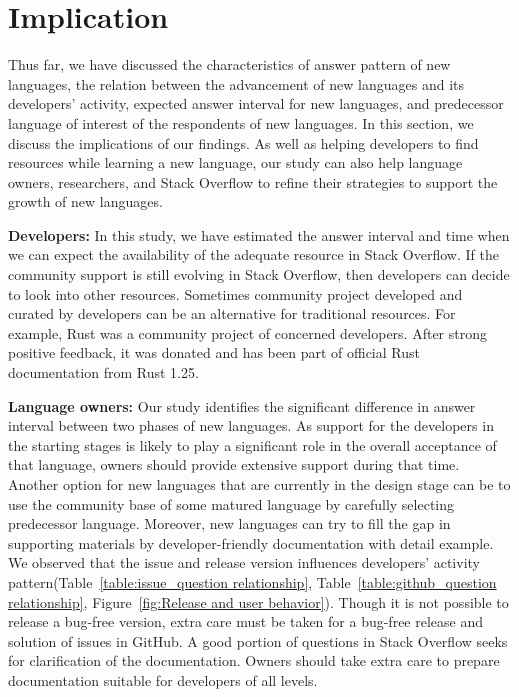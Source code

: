 \section{Implication}
\label{sec:Implication}
Thus far, we have discussed the characteristics of answer pattern of new languages, the relation between the advancement of new languages and its developers' activity, expected answer interval for new languages, and predecessor language of interest of the respondents of new languages. In this section, we discuss the implications of our findings. As well as helping developers to find resources while learning a new language, our study can also help language owners, researchers, and Stack Overflow to refine their strategies to support the growth of new languages. 

\indent \textbf{Developers:} In this study, we have estimated the answer interval and time when we can expect the availability of the adequate resource in Stack Overflow. If the community support is still evolving in Stack Overflow, then developers can decide to look into other resources. Sometimes community project developed and curated by developers can be an alternative for traditional resources. For example, Rust was a community project of concerned developers. After strong positive feedback, it was donated and has been part of official Rust documentation from Rust 1.25.

\indent \textbf{Language owners:} Our study identifies the significant difference in answer interval between two phases of new languages. As support for the developers in the starting stages is likely to play a significant role in the overall acceptance of that language, owners should provide extensive support during that time. Another option for new languages that are currently in the design stage can be to use the community base of some matured language by carefully selecting predecessor language. Moreover, new languages can try to fill the gap in supporting materials by developer-friendly documentation with detail example. We observed that the issue and release version influences developers' activity pattern(Table~\ref{table:issue_question relationship}, Table~\ref{table:github_question relationship}, Figure~\ref{fig:Release and user behavior}). Though it is not possible to release a bug-free version, extra care must be taken for a bug-free release and solution of issues in GitHub. A good portion of questions in Stack Overflow seeks for clarification of the documentation. Owners should take extra care to prepare documentation suitable for developers of all levels. 

